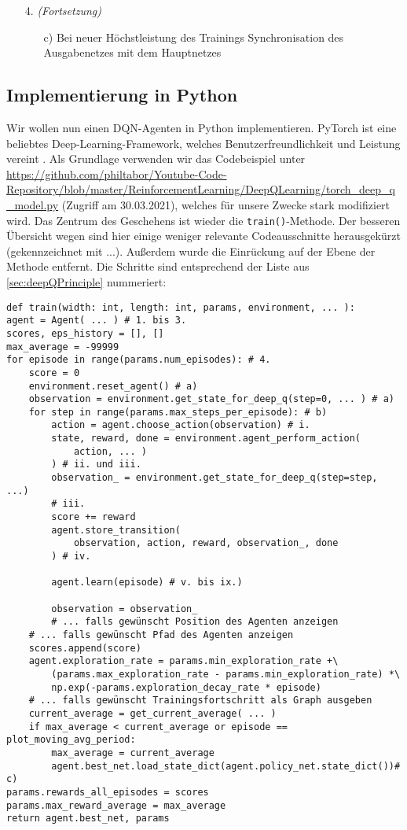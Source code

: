 \begin{enumerate}
    \item[4.] \textit{(Fortsetzung)} 
    \begin{enumerate}
        \item[c)] Bei neuer Höchstleistung des Trainings Synchronisation des Ausgabenetzes mit dem Hauptnetzes
    \end{enumerate}
\end{enumerate}

\subsection{Implementierung in Python} \label{sec:deepQImplementation}
Wir wollen nun einen DQN-Agenten in Python implementieren. PyTorch ist eine beliebtes Deep-Learning-Framework, welches Benutzerfreundlichkeit und Leistung vereint \cite{x01_pytorch}. Als Grundlage verwenden wir das Codebeispiel unter \url{https://github.com/philtabor/Youtube-Code-Repository/blob/master/ReinforcementLearning/DeepQLearning/torch_deep_q_model.py} (Zugriff am 30.03.2021), welches für unsere Zwecke stark modifiziert wird. Das Zentrum des Geschehens ist wieder die \texttt{train()}-Methode. Der besseren Übersicht wegen sind hier einige weniger relevante Codeausschnitte herausgekürzt (gekennzeichnet mit ...). Außerdem wurde die Einrückung auf der Ebene der Methode entfernt. Die Schritte sind entsprechend der Liste aus \ref{sec:deepQPrinciple} nummeriert:
\begin{verbatim}
def train(width: int, length: int, params, environment, ... ):
agent = Agent( ... ) # 1. bis 3.
scores, eps_history = [], []
max_average = -99999
for episode in range(params.num_episodes): # 4.
    score = 0
    environment.reset_agent() # a)
    observation = environment.get_state_for_deep_q(step=0, ... ) # a)
    for step in range(params.max_steps_per_episode): # b)
        action = agent.choose_action(observation) # i.
        state, reward, done = environment.agent_perform_action(
            action, ... )
        ) # ii. und iii.
        observation_ = environment.get_state_for_deep_q(step=step, ...)
        # iii.
        score += reward
        agent.store_transition(
            observation, action, reward, observation_, done
        ) # iv.

        agent.learn(episode) # v. bis ix.)

        observation = observation_
        # ... falls gewünscht Position des Agenten anzeigen
    # ... falls gewünscht Pfad des Agenten anzeigen
    scores.append(score)
    agent.exploration_rate = params.min_exploration_rate +\
        (params.max_exploration_rate - params.min_exploration_rate) *\
        np.exp(-params.exploration_decay_rate * episode)
    # ... falls gewünscht Trainingsfortschritt als Graph ausgeben
    current_average = get_current_average( ... )
    if max_average < current_average or episode == plot_moving_avg_period:
        max_average = current_average
        agent.best_net.load_state_dict(agent.policy_net.state_dict())# c)
params.rewards_all_episodes = scores
params.max_reward_average = max_average
return agent.best_net, params
\end{verbatim}
